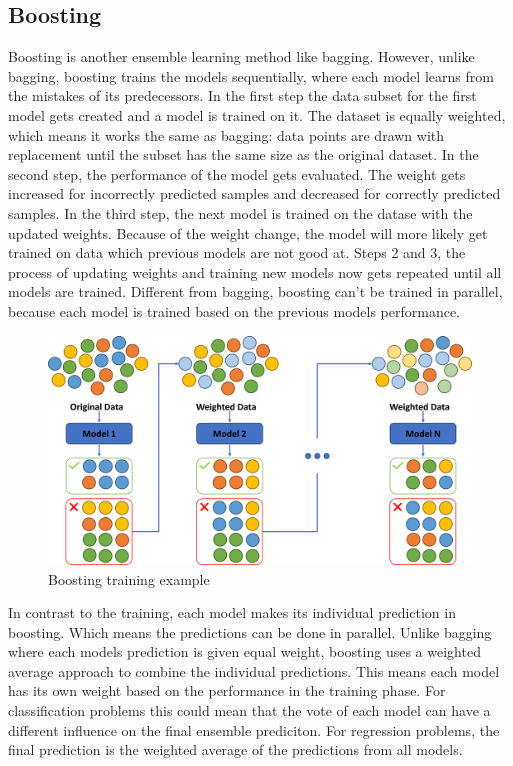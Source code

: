 \subsection{Boosting}
Boosting \citep{Schapire1990} is another ensemble learning method like bagging.
However, unlike bagging, boosting trains the models sequentially, where each
model learns from the mistakes of its predecessors.
In the first step the data subset for the first model gets created and a model 
is trained on it. The dataset is equally weighted, which means it works the same 
as bagging: data points are drawn with replacement until the subset has the same
size as the original dataset.
In the second step, the performance of the model gets evaluated. The weight gets
increased for incorrectly predicted samples and decreased for correctly predicted
samples. 
In the third step, the next model is trained on the datase with the updated weights.
Because of the weight change, the model will more likely get trained on data which
previous models are not good at.
Steps 2 and 3, the process of updating weights and training new models now gets 
repeated until all models are trained.
Different from bagging, boosting can't be trained in parallel, because each model
is trained based on the previous models performance. 

\begin{figure}[htbp]
    \centering
    \includegraphics[width=.5\textwidth]{figures/boosting_training}
    \caption{Boosting training example}
\end{figure}

In contrast to the training, each model makes its individual prediction in boosting.
Which means the predictions can be done in parallel.
Unlike bagging where each models prediction is given equal weight, boosting uses
a weighted average approach to combine the individual predictions. This means
each model has its own weight based on the performance in the training phase.
For classification problems this could mean that the vote of each model can have
a different influence on the final ensemble prediciton.
For regression problems, the final prediction is the weighted average of the
predictions from all models.

